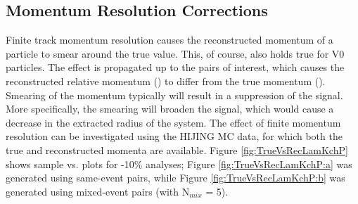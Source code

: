 \documentclass[/home/jesse/Analysis/FemtoAnalysis/AnalysisNotes/AnalysisNoteJBuxton.tex]{subfiles}
\begin{document}
\subsection{Momentum Resolution Corrections}
\label{MomentumResolutionCorrections}

Finite track momentum resolution causes the reconstructed momentum of a particle to smear around the true value.
This, of course, also holds true for V0 particles.
The effect is propagated up to the pairs of interest, which causes the reconstructed relative momentum (\krec) to differ from the true momentum (\ktrue).
Smearing of the momentum typically will result in a suppression of the signal.  More specifically, the smearing will broaden the signal, which would cause a decrease in the extracted radius of the system.
The effect of finite momentum resolution can be investigated using the HIJING MC data, for which both the true and reconstructed momenta are available.
Figure \ref{fig:TrueVsRecLamKchP} shows sample \ktrue vs. \krec plots for -10\% analyses; Figure \ref{fig:TrueVsRecLamKchP:a} was generated using same-event pairs, while Figure \ref{fig:TrueVsRecLamKchP:b} was generated using mixed-event pairs (with N$_{mix}$ = 5).  
\end{document}
